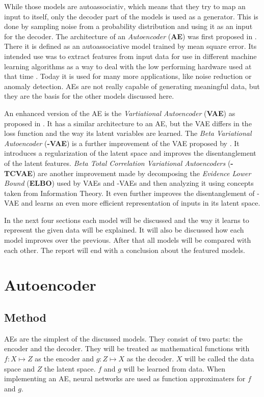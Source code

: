 \documentclass[a4paper]{IEEEtran}
\begin{document}
While those models are autoassociativ, which means that they try to map an input to itself, only the decoder part of the models is used as a generator. This is done by sampling noise from a probability distribution and using it as an input for the decoder. The architecture of an \textit{Autoencoder} (\textbf{AE}) was first proposed in \cite{ballard1987modulalearning}. There it is defined as an autoassociative model trained by mean square error. Its intended use was to extract features from input data for use in different machine learning algorithms as a way to deal with the low performing hardware used at that time \cite{ballard1987modulalearning}. Today it is used for many more applications, like noise reduction or anomaly detection. AEs are not really capable of generating meaningful data, but they are the basis for the other models discussed here.

An enhanced version of the AE is the \textit{Vartiational Autoencoder} (\textbf{VAE}) as proposed in \cite{kingma2014autoencoding}. It has a similar architecture to an AE, but the VAE differs in the loss function and the way its latent variables are learned. The \textit{Beta Variational Autoencoder} (\textbf{\textbeta -VAE}) is a further improvement of the VAE proposed by \cite{higgins2017vae}. It introduces a regularization of the latent space and improves the disentanglement of the latent features. \textit{Beta Total Correlation Variational Autoencoders} (\textbf{\textbeta -TCVAE}) \cite{chen2019isolating} are another improvement made by decomposing the \textit{Evidence Lower Bound} (\textbf{ELBO}) used by VAEs and \textbeta -VAEs and then analyzing it using concepts taken from Information Theory. It even further improves the disentanglement of \textbeta -VAE and learns an even more efficient representation of inputs in its latent space.

In the next four sections each model will be discussed and the way it learns to represent the given data will be explained. It will also be discussed how each model improves over the previous. After that all models will be compared with each other. The report will end with a conclusion about the featured models.

\section{Autoencoder}
\subsection{Method}
AEs are the simplest of the discussed models. They consist of two parts: the encoder and the decoder. They will be treated as mathematical functions with $f : X \mapsto Z$ as the encoder and $g : Z \mapsto X$ as the decoder. $X$ will be called the data space and $Z$ the latent space. $f$ and $g$ will be learned from data. When implementing an AE, neural networks are used as function approximaters for $f$ and $g$.
\end{document}
